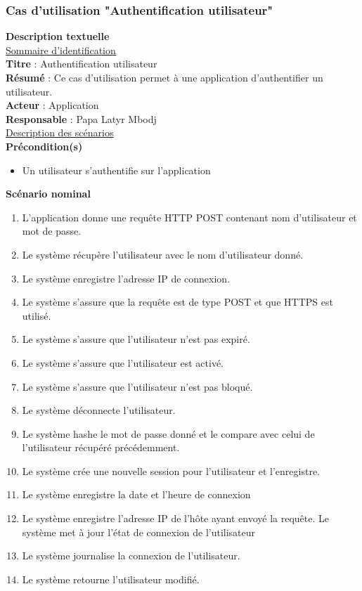 \subsubsection{Cas d'utilisation "Authentification utilisateur"}
\textbf{\RIGHTarrow Description textuelle}\\
\underline{\underline{Sommaire d’identification}} \\
\textbf{Titre} : Authentification utilisateur\\
\textbf{Résumé} : Ce cas d’utilisation permet à une application d'authentifier un utilisateur.\\
\textbf{Acteur} : Application\\	
\textbf{Responsable} : Papa Latyr Mbodj\\
\underline{\underline{Description des scénarios}}\\
\textbf{Précondition(s)}
\begin{itemize}
	\item Un utilisateur s'authentifie sur l'application
\end{itemize}
\textbf{Scénario nominal}
\begin{enumerate}
	\item L'application donne une requête HTTP POST contenant nom d'utilisateur et mot de passe.
	\item Le système récupère l'utilisateur avec le nom d'utilisateur donné.
	\item Le système enregistre l'adresse IP de connexion.
	\item Le système s'assure que la requête est de type POST et que HTTPS est utilisé.
	\item Le système s'assure que l'utilisateur n'est pas expiré.
	\item Le système s'assure que l'utilisateur est activé.
	\item Le système s'assure que l'utilisateur n'est pas bloqué.
	\item Le système déconnecte l'utilisateur.
	\item Le système hashe le mot de passe donné et le compare avec celui de l'utilisateur récupéré précédemment.
	\item Le système crée une nouvelle session pour l'utilisateur et l'enregistre.
	\item Le système enregistre la date et l'heure de connexion 
	\item Le système enregistre l'adresse IP de l'hôte ayant envoyé la requête.
	Le système met à jour l'état de connexion de l'utilisateur
	\item Le système journalise la connexion de l'utilisateur.
	\item Le système retourne l'utilisateur modifié.
\end{enumerate}
